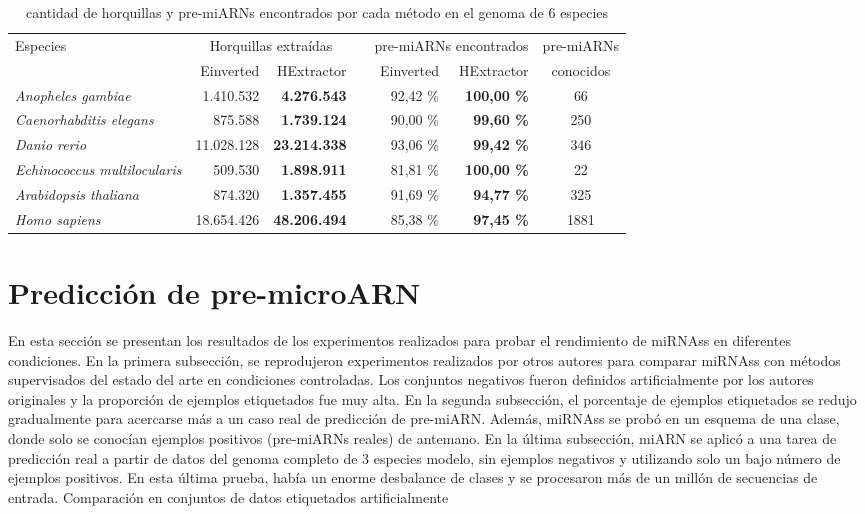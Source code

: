 \begin{table}[t]
	\centering
	\small
	\begin{tabular}{l r r r r r c}
		\toprule
		\multirow{2}{*}{Especies} & \multicolumn{2}{c}{Horquillas extraídas}  & & \multicolumn{2}{c}{pre-miARNs encontrados}    &    pre-miARNs  \\ \cmidrule{2-3} \cmidrule{5-6}
						    &    Einverted  &       HExtractor     & & Einverted     &   HExtractor  &  conocidos \\ \cmidrule{1-7}
		\textit{Anopheles gambiae}          &  1.410.532    &  \textbf{4.276.543}  & &  92,42 \%     &    \textbf{100,00  \%}       &   66        \\
		\textit{Caenorhabditis elegans}     &    875.588    &  \textbf{1.739.124}  & &  90,00 \%     &     \textbf{99,60  \%}       &  250        \\
		\textit{Danio rerio}                & 11.028.128    & \textbf{23.214.338}  & &  93,06 \%     &     \textbf{99,42  \%}       &  346        \\
		\textit{Echinococcus multilocularis}&    509.530    &  \textbf{1.898.911}  & &  81,81 \%     &    \textbf{100,00  \%}       &   22        \\
		\textit{Arabidopsis thaliana}       &    874.320    &  \textbf{1.357.455}  & &  91,69 \%     &     \textbf{94,77  \%}       &  325        \\
		\textit{Homo sapiens}               & 18.654.426    & \textbf{48.206.494}  & &  85,38 \%     &     \textbf{97,45  \%}       & 1881        \\
		\bottomrule
	\end{tabular}
	\label{tab:hextractor}
	\caption[Cantidad de horquillas y pre-miARN en varios genomas]{cantidad de horquillas y pre-miARNs encontrados por cada método en el genoma de 6 especies}
\end{table}

\section{Predicción de pre-microARN}

En esta sección se presentan los resultados de los experimentos realizados para probar el rendimiento de miRNAss en diferentes condiciones. En la primera
subsección, se reprodujeron experimentos realizados por otros autores para comparar miRNAss con métodos supervisados del estado del arte en condiciones
controladas. Los conjuntos negativos fueron definidos artificialmente por los autores originales y la proporción de ejemplos etiquetados fue muy alta. En la
segunda subsección, el porcentaje de ejemplos etiquetados se redujo gradualmente para acercarse más a un caso real de predicción de pre-miARN. Además,
miRNAss se probó en un esquema de una clase, donde solo se conocían ejemplos positivos (pre-miARNs reales) de antemano. En la última subsección, miARN se
aplicó a una tarea de predicción real a partir de datos del genoma completo de 3 especies modelo, sin ejemplos negativos y utilizando solo un bajo número de
ejemplos positivos. En esta última prueba, había un enorme desbalance de clases y se procesaron más de un millón de secuencias de entrada.
Comparación en conjuntos de datos etiquetados artificialmente

